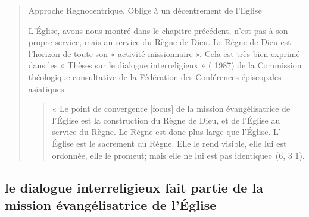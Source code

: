 \begin{quote}
\begin{Synthesis}
Approche Regnocentrique. Oblige à un décentrement de l'Eglise 
\end{Synthesis}
L'Église, avons-nous montré dans le chapitre précédent,
n'est pas à son propre service, mais au service du Règne de
Dieu. Le Règne de Dieu est l'horizon de toute son « activité
missionnaire ». Cela est très bien exprimé dans les « Thèses
sur le dialogue interreligieux » ( 1987) de la Commission théologique
consultative de la Fédération des Conférences épiscopales
asiatiques: \begin{quote}
    « Le point de convergence [focus] de la
mission évangélisatrice de l'Église est la construction du
Règne de Dieu, et de l'Église au service du Règne. Le Règne
est donc plus large que l'Église. L' Église est le sacrement du
Règne. Elle le rend visible, elle lui est ordonnée, elle le promeut;
mais elle ne lui est pas identique» (6, 3 1).
\end{quote}

\end{quote}

\subsection{le dialogue interreligieux
fait partie de la mission évangélisatrice de l’Église}


